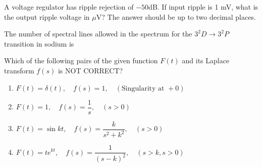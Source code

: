 \item A voltage regulator has ripple rejection of $-50$dB. If input ripple is 1 mV, what is the output ripple voltage in $\mu$V? The answer should be up to two decimal places.

\underline{\hspace{2cm}}

\item The number of spectral lines allowed in the spectrum for the $3^2D \rightarrow 3^2P$ transition in sodium is

\underline{\hspace{2cm}}

\item Which of the following pairs of the given function $F(t)$ and its Laplace transform $f(s)$ is NOT CORRECT?


\begin{enumerate}
    \item $F(t)=\delta(t), \quad f(s)=1, \quad (\text{Singularity at }+0)$
    \item $F(t)=1, \quad f(s)=\dfrac{1}{s}, \quad (s>0)$
    \item $F(t)=\sin kt, \quad f(s)=\dfrac{k}{s^2+k^2}, \quad (s>0)$
    \item $F(t)=te^{kt}, \quad f(s)=\dfrac{1}{(s-k)^2}, \quad (s>k, s>0)$
\end{enumerate}





